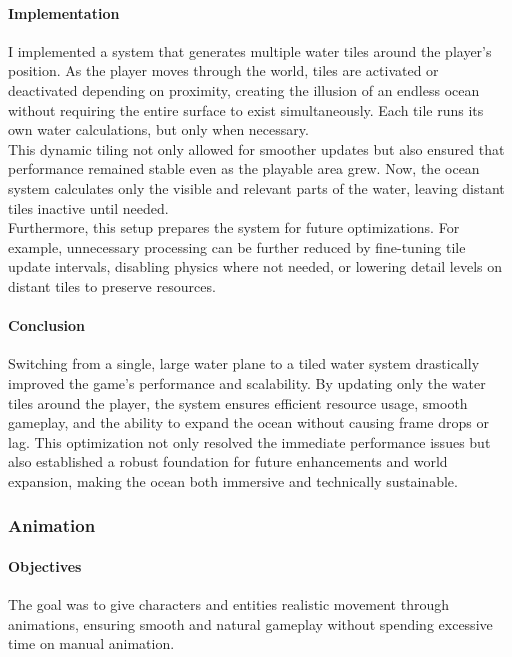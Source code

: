 \documentclass{article}
\begin{document}
\paragraph{Implementation}\hfill

I implemented a system that generates multiple water tiles around the player's position. As the player moves through the world, tiles are activated or deactivated depending on proximity, creating the illusion of an endless ocean without requiring the entire surface to exist simultaneously. Each tile runs its own water calculations, but only when necessary.\\

This dynamic tiling not only allowed for smoother updates but also ensured that performance remained stable even as the playable area grew. Now, the ocean system calculates only the visible and relevant parts of the water, leaving distant tiles inactive until needed.\\

Furthermore, this setup prepares the system for future optimizations. For example, unnecessary processing can be further reduced by fine-tuning tile update intervals, disabling physics where not needed, or lowering detail levels on distant tiles to preserve resources.

\paragraph{Conclusion}\hfill

Switching from a single, large water plane to a tiled water system drastically improved the game's performance and scalability. By updating only the water tiles around the player, the system ensures efficient resource usage, smooth gameplay, and the ability to expand the ocean without causing frame drops or lag. This optimization not only resolved the immediate performance issues but also established a robust foundation for future enhancements and world expansion, making the ocean both immersive and technically sustainable.



\subsubsection{Animation}
\paragraph{Objectives}\hfill

The goal was to give characters and entities realistic movement through animations, ensuring smooth and natural gameplay without spending excessive time on manual animation.
\end{document}
